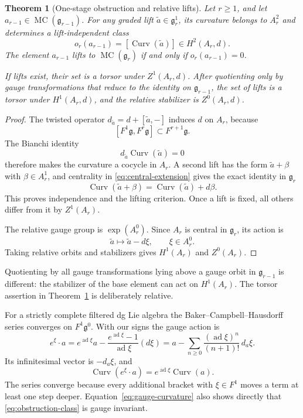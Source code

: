 \documentclass[11pt]{article}
\newtheorem{theorem}{Theorem}[section]
\theoremstyle{definition}
\theoremstyle{remark}
\newcommand{\MC}{\operatorname{MC}}
\newcommand{\Curv}{\operatorname{Curv}}
\begin{document}
\begin{theorem}[One-stage obstruction and relative lifts]
\label{thm:one-stage}
Let $r\geq1$, and let $a_{r-1}\in\MC(\mathfrak g_{r-1})$.  For any graded
lift $\widetilde a\in\mathfrak g_r^1$, its curvature belongs to $A_r^2$ and
determines a lift-independent class
\[
 o_r(a_{r-1})=[\Curv(\widetilde a)]
 \in H^2(A_r,d).
 \tag{2.3}\label{eq:obstruction-class}
\]
The element $a_{r-1}$ lifts to $\MC(\mathfrak g_r)$ if and only if
$o_r(a_{r-1})=0$.

If lifts exist, their set is a torsor under $Z^1(A_r,d)$.  After quotienting
only by gauge transformations that reduce to the identity on
$\mathfrak g_{r-1}$, the set of lifts is a torsor under $H^1(A_r,d)$, and
the relative stabilizer is $Z^0(A_r,d)$.
\end{theorem}

\begin{proof}
The twisted operator $d_{\widetilde a}=d+[\widetilde a,-]$ induces $d$ on
$A_r$, because
\[
 [F^1\mathfrak g,F^r\mathfrak g]\subset F^{r+1}\mathfrak g.
\]
The Bianchi identity
\[
 d_{\widetilde a}\Curv(\widetilde a)=0
 \tag{2.4}\label{eq:bianchi}
\]
therefore makes the curvature a cocycle in $A_r$.  A second lift has the form
$\widetilde a+\beta$ with $\beta\in A_r^1$, and centrality in
\eqref{eq:central-extension} gives the exact identity in $\mathfrak g_r$
\[
 \Curv(\widetilde a+\beta)=\Curv(\widetilde a)+d\beta.
 \tag{2.5}\label{eq:linear-correction}
\]
This proves independence and the lifting criterion.  Once a lift is fixed,
all others differ from it by $Z^1(A_r)$.

The relative gauge group is $\exp(A_r^0)$.  Since $A_r$ is central in
$\mathfrak g_r$, its action is
\[
 \widetilde a\longmapsto\widetilde a-d\xi,
 \qquad \xi\in A_r^0.
\]
Taking relative orbits and stabilizers gives $H^1(A_r)$ and $Z^0(A_r)$.
\end{proof}

Quotienting by all gauge transformations lying above a gauge orbit in
$\mathfrak g_{r-1}$ is different: the stabilizer of the base element can act
on $H^1(A_r)$.  The torsor assertion in Theorem~\ref{thm:one-stage} is
deliberately relative.

For a strictly complete filtered dg Lie algebra the Baker--Campbell--Hausdorff
series converges on $F^1\mathfrak g^0$.  With our signs the gauge action is
\[
 e^\xi\cdot a
 =e^{\operatorname{ad}\xi}a
 -\frac{e^{\operatorname{ad}\xi}-1}{\operatorname{ad}\xi}(d\xi)
 =a-\sum_{n\geq0}
 \frac{(\operatorname{ad}\xi)^n}{(n+1)!}\,d_a\xi .
 \tag{2.6}\label{eq:gauge-action}
\]
Its infinitesimal vector is $-d_a\xi$, and
\[
 \Curv(e^\xi\cdot a)
 =e^{\operatorname{ad}\xi}\Curv(a).
 \tag{2.7}\label{eq:gauge-curvature}
\]
The series converge because every additional bracket with $\xi\in F^1$
moves a term at least one step deeper.  Equation~\eqref{eq:gauge-curvature}
also shows directly that \eqref{eq:obstruction-class} is gauge invariant.
\end{document}
